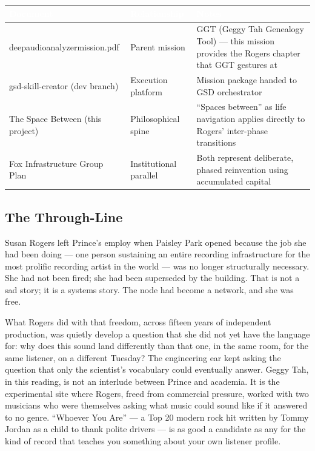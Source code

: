 \documentclass[11pt,letterpaper]{article}
\newcommand{\tableheader}[1]{\textbf{\sffamily\textcolor{white}{#1}}}
\begin{document}
\begin{center}
\begin{tabularx}{\textwidth}{L{4cm}L{3cm}X}
\toprule
{}
\tableheader{Document} & \tableheader{Relationship} & \tableheader{Notes} \\
\midrule
deepaudioanalyzermission.pdf & Parent mission & GGT (Geggy Tah Genealogy Tool) --- this mission provides the Rogers chapter that GGT gestures at \\
gsd-skill-creator (dev branch) & Execution platform & Mission package handed to GSD orchestrator \\
The Space Between (this project) & Philosophical spine & ``Spaces between'' as life navigation applies directly to Rogers' inter-phase transitions \\
Fox Infrastructure Group Plan & Institutional parallel & Both represent deliberate, phased reinvention using accumulated capital \\
\bottomrule
\end{tabularx}
\end{center}

\subsection{The Through-Line}

Susan Rogers left Prince's employ when Paisley Park opened because the job she had been doing --- one person sustaining an entire recording infrastructure for the most prolific recording artist in the world --- was no longer structurally necessary. She had not been fired; she had been superseded by the building. That is not a sad story; it is a systems story. The node had become a network, and she was free.

What Rogers did with that freedom, across fifteen years of independent production, was quietly develop a question that she did not yet have the language for: why does this sound land differently than that one, in the same room, for the same listener, on a different Tuesday? The engineering ear kept asking the question that only the scientist's vocabulary could eventually answer. Geggy Tah, in this reading, is not an interlude between Prince and academia. It is the experimental site where Rogers, freed from commercial pressure, worked with two musicians who were themselves asking what music could sound like if it answered to no genre. ``Whoever You Are'' --- a Top 20 modern rock hit written by Tommy Jordan as a child to thank polite drivers --- is as good a candidate as any for the kind of record that teaches you something about your own listener profile.
\end{document}
